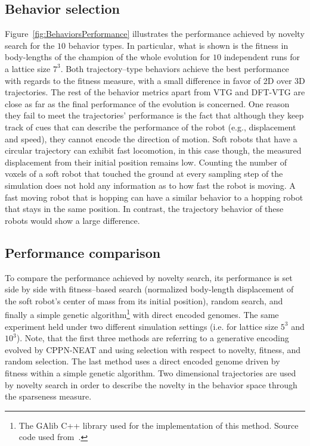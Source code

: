 \documentclass{sig-alternate}
\begin{document}
\subsection{Behavior selection} 

Figure~\ref{fig:BehaviorsPerformance} illustrates the performance achieved by novelty search for the $10$ behavior types. In particular, what is shown is the fitness in body-lengths of the champion of the whole evolution for $10$ independent runs for a lattice size $7^3$. Both trajectory--type behaviors achieve the best performance with regards to the fitness measure, with a small difference in favor of 2D over 3D trajectories. The rest of the behavior metrics apart from VTG and DFT-VTG are close as far as the final performance of the evolution is concerned. One reason they fail to meet the trajectories' performance is the fact that although they keep track of cues that can describe the performance of the robot (e.g., displacement and speed), they cannot encode the direction of motion. Soft robots that have a circular trajectory can exhibit fast locomotion, in this case though, the measured displacement from their initial position remains low. Counting the number of voxels of a soft robot that touched the ground at every sampling step of the simulation does not hold any information as to how fast the robot is moving. A fast moving robot that is hopping can have a similar behavior to a hopping robot that stays in the same position. In contrast, the trajectory behavior of these robots would show a large difference.


\subsection{Performance comparison}
To compare the performance achieved by novelty search, its performance is set side by side with fitness--based search (normalized body-length displacement of the soft robot's center of mass from its initial position), random search, and finally a simple genetic algorithm\footnote{The GAlib C++ library \cite{wall1996galib} used for the implementation of this method. Source code used from~\cite{cheney2013unshackling}.} with direct encoded genomes. The same experiment held under two different simulation settings (i.e. for lattice size $5^3$ and $10^3$). Note, that the first three methods are referring to a generative encoding evolved by CPPN-NEAT and using selection with respect to novelty, fitness, and random selection. The last method uses a direct encoded genome driven by fitness within a simple genetic algorithm. Two dimensional trajectories are used by novelty search in order to describe the novelty in the behavior space through the sparseness measure.
\end{document}
